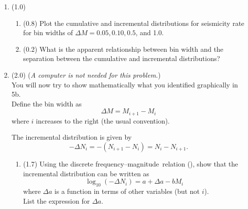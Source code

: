 \documentclass[11pt,titlepage,fleqn]{article}
\newcommand{\fmag}{frequency--magnitude}
\begin{document}
\begin{enumerate}
\begin{enumerate}
\item (0.1) Given your $a$ and $b$ values, how many $M \ge 0$ earthquakes are expected on Earth per year?

\item (0.1) Given your $a$ and $b$ values, how many earthquakes (of any magnitude) are expected on Earth per year?
\end{enumerate}


\item (1.0)
%
\begin{enumerate}
\item (0.8) Plot the cumulative and incremental distributions for seismicity rate for bin widths of $\Delta M = 0.05, 0.10, 0.5$, and 1.0.
\item (0.2) What is the apparent relationship between bin width and the separation between the cumulative and incremental distributions?
\end{enumerate}


\pagebreak
\item (2.0) ({\em A computer is not needed for this problem.}) \\
You will now try to show mathematically what you identified graphically in 5b. \\
Define the bin width as
%
\begin{equation}
\Delta M = M_{i+1} - M_i
\label{dM}
\end{equation}
%
where $i$ increases to the right (the usual convention).

The incremental distribution is given by
%
\begin{equation}
-\Delta N_i = -(N_{i+1} - N_i) = N_i - N_{i+1}.
\end{equation}
%
\begin{enumerate}
\item (1.7) Using the discrete \fmag\ relation (), show that the incremental distribution can be written as
%
\begin{equation}
\log_{10}(-\Delta N_i) = a + \Delta a - b M_i
\label{inc}
\end{equation}
%
where $\Delta a$ is a function in terms of other variables (but not $i$). \\
List the expression for $\Delta a$.



\end{enumerate}
\end{enumerate}
\end{document}
